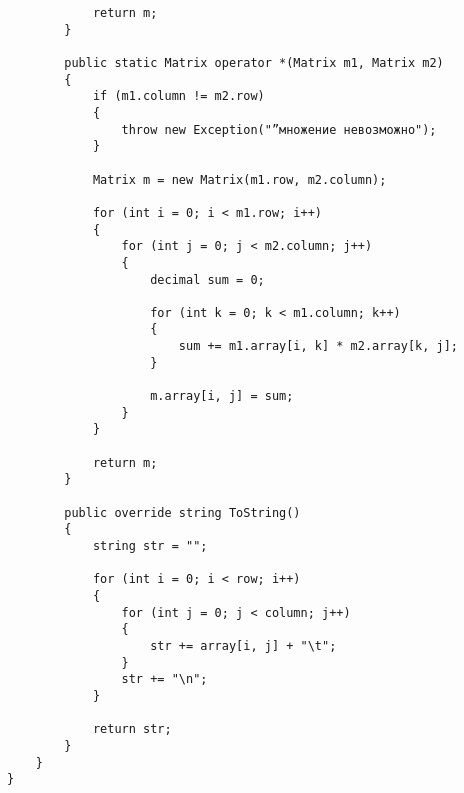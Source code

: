\documentclass[12pt]{article} %
\begin{document}
\begin{verbatim}
            return m;
        }

        public static Matrix operator *(Matrix m1, Matrix m2)
        {
            if (m1.column != m2.row)
            {
                throw new Exception("”множение невозможно");
            }

            Matrix m = new Matrix(m1.row, m2.column);

            for (int i = 0; i < m1.row; i++)
            {
                for (int j = 0; j < m2.column; j++)
                {
                    decimal sum = 0;

                    for (int k = 0; k < m1.column; k++)
                    {
                        sum += m1.array[i, k] * m2.array[k, j];
                    }

                    m.array[i, j] = sum;
                }
            }

            return m;
        }

        public override string ToString()
        {
            string str = "";

            for (int i = 0; i < row; i++)
            {
                for (int j = 0; j < column; j++)
                {
                    str += array[i, j] + "\t";
                }
                str += "\n";
            }

            return str;
        }
    }
}

\end{verbatim}
\end{document}
